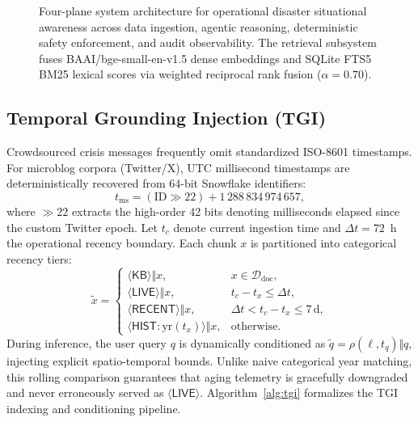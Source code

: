 \documentclass[conference]{IEEEtran}
\begin{document}
\begin{figure}[!t]
{%
}
\caption{Four-plane system architecture for operational disaster situational awareness across data ingestion, agentic reasoning, deterministic safety enforcement, and audit observability. The retrieval subsystem fuses BAAI/bge-small-en-v1.5 dense embeddings and SQLite FTS5 BM25 lexical scores via weighted reciprocal rank fusion ($\alpha = 0.70$).}
\label{fig:arch}
\end{figure}

\subsection{Temporal Grounding Injection (TGI)}
Crowdsourced crisis messages frequently omit standardized ISO-8601 timestamps. For microblog corpora (Twitter/X), UTC millisecond timestamps are deterministically recovered from 64-bit Snowflake identifiers:
\begin{equation}
t_{\mathrm{ms}} = (\mathrm{ID} \gg 22) + 1\,288\,834\,974\,657,
\label{eq:snow}
\end{equation}
where $\gg 22$ extracts the high-order 42 bits denoting milliseconds elapsed since the custom Twitter epoch. Let $t_c$ denote current ingestion time and $\Delta t = 72$~h the operational recency boundary. Each chunk $x$ is partitioned into categorical recency tiers:
\begin{equation}
\tilde{x} = \begin{cases}
\langle\mathsf{KB}\rangle \Vert x, & x \in \mathcal{D}_{\mathrm{doc}},\\
\langle\mathsf{LIVE}\rangle \Vert x, & t_c - t_x \le \Delta t,\\
\langle\mathsf{RECENT}\rangle \Vert x, & \Delta t < t_c - t_x \le 7\,\text{d},\\
\langle\mathsf{HIST}:\mathrm{yr}(t_x)\rangle \Vert x, & \text{otherwise}.
\end{cases}
\label{eq:tgi}
\end{equation}
During inference, the user query $q$ is dynamically conditioned as $\tilde{q} = \rho(\ell, t_q) \Vert q$, injecting explicit spatio-temporal bounds. Unlike naive categorical year matching, this rolling comparison guarantees that aging telemetry is gracefully downgraded and never erroneously served as $\langle\mathsf{LIVE}\rangle$. Algorithm~\ref{alg:tgi} formalizes the TGI indexing and conditioning pipeline.
\end{document}
